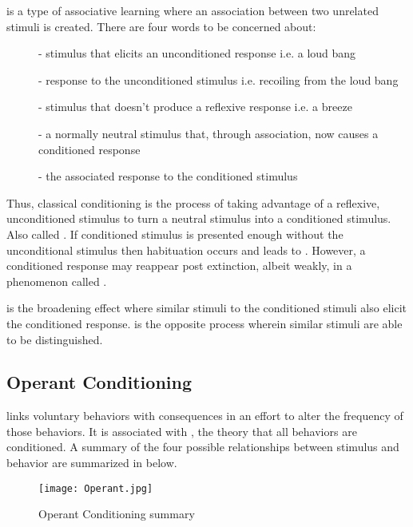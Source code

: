 \documentclass[../Psych_Soci_review.tex]{subfiles}
\begin{document}
 is a type of associative learning where an
association between two unrelated stimuli is created. There are four words to be
concerned about: 
\begin{description}
  \item [] - stimulus that elicits an
    unconditioned response i.e. a loud bang
  \item [] - response to the unconditioned
    stimulus i.e. recoiling from the loud bang
  \item [] - stimulus that doesn't produce a reflexive
    response i.e. a breeze
  \item [] - a normally neutral stimulus that,
    through association, now causes a conditioned response
  \item [] - the associated response to the
    conditioned stimulus
\end{description}
Thus, classical conditioning is the process of taking advantage of a reflexive,
unconditioned stimulus to turn a neutral stimulus into a conditioned stimulus.
Also called . If conditioned stimulus is presented enough
without the unconditional stimulus then habituation occurs and leads to
. However, a conditioned response may reappear post
extinction, albeit weakly, in a phenomenon called .

 is the broadening effect where similar stimuli to the
conditioned stimuli also elicit the conditioned response. 
is the opposite process wherein similar stimuli are able to be distinguished.

\subsection{Operant Conditioning\supdag}

 links voluntary behaviors with consequences in an
effort to alter the frequency of those behaviors. It is associated with
, the theory that all behaviors are conditioned. A summary of
the four possible relationships between stimulus and behavior are summarized in
 below.
\begin{figure}[h]
  \centering
  \caption{Operant Conditioning summary}
  \texttt{[image: Operant.jpg]}
  \label{Operant}
\end{figure}
\end{document}
